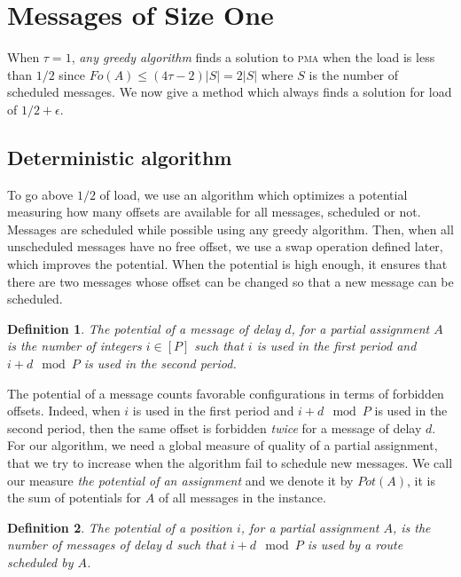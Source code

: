\documentclass[10pt, conference, letterpaper]{algotel}
\newtheorem{definition}{Definition}
\newcommand\pma{\textsc{pma}\xspace}
\begin{document}
 \section{Messages of Size One} \label{sec:small}

When $\tau = 1$, \emph{any greedy algorithm} finds a solution to \pma when the load is less than $1/2$ since $Fo(A) \leq (4\tau -2)|S| = 2|S|$ where $S$ is the number of scheduled messages. We now give a method which always finds a solution for load of $1/2 + \epsilon$.

\subsection{Deterministic algorithm}

To go above $1/2$ of load, we use an algorithm which optimizes a potential measuring how many offsets are available for all messages, scheduled or not. Messages are scheduled while possible using any greedy algorithm.
Then, when all unscheduled messages have no free offset, we use a swap operation defined later, which improves the potential. When the potential is high enough, it ensures that there are two messages whose offset can be changed so that a new message can be scheduled. 
 

\begin{definition}
The potential of a message of delay $d$, for a partial assignment $A$
is the number of integers $i \in [P]$ such that $i$ is used in the first period and $i+d \mod P$ is used in the second period.
\end{definition}

The potential of a message counts favorable configurations in terms of forbidden offsets.
Indeed, when $i$ is used in the first period and $i+d \mod P$ is used in the second period,
then the same offset is forbidden \emph{twice} for a message of delay $d$. 
For our algorithm, we need a global measure of quality of a partial assignment, 
that we try to increase when the algorithm fail to schedule new messages. 
We call our measure \emph{the potential of an assignment} and we denote it by $Pot(A)$, it is the sum of potentials for $A$ of all messages in the instance.


\begin{definition}
The potential of a position $i$, for a partial assignment $A$, is the number of messages of delay $d$ such that $i+d \mod P$ is used by a route scheduled by $A$. 
\end{definition}
\end{document}
